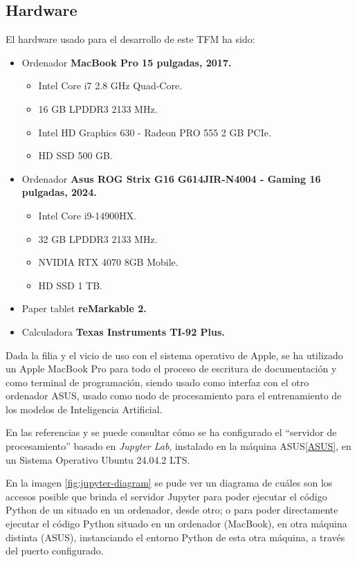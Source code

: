 \subsection{Hardware}

El hardware usado para el desarrollo de este TFM ha sido:

\begin{itemize}
    \item Ordenador \textbf{MacBook Pro 15 pulgadas, 2017.}
    \begin{itemize}
        \item Intel Core i7 2.8 GHz Quad-Core.
        \item 16 GB LPDDR3 2133 MHz.
        \item Intel HD Graphics 630 - Radeon PRO 555 2 GB PCIe.
        \item HD SSD 500 GB.
    \end{itemize}
    \item Ordenador \textbf{Asus ROG Strix G16 G614JIR-N4004 - Gaming 16 pulgadas, 2024.}
    \label{ASUS}
    \begin{itemize}
        \item Intel Core i9-14900HX.
        \item 32 GB LPDDR3 2133 MHz.
        \item NVIDIA RTX 4070 8GB Mobile.
        \item HD SSD 1 TB.
    \end{itemize}
    \item Paper tablet \textbf{reMarkable 2.}
    \item Calculadora \textbf{Texas Instruments TI-92 Plus.}
\end{itemize}

Dada la filia y el vicio de uso con el sistema operativo de Apple, se ha utilizado un Apple MacBook Pro para todo el proceso de escritura de documentación y como terminal de programación, siendo usado como interfaz con el otro ordenador ASUS, usado como nodo de procesamiento para el entrenamiento de los modelos de Inteligencia Artificial.

En las referencias \cite{geeksforgeeks2025jupyter} y \cite{vscode2025jupyter} se puede consultar cómo se ha configurado el ``servidor de procesamiento'' basado en \emph{Jupyter Lab}, instalado en la máquina ASUS\ref{ASUS}, en un Sistema Operativo Ubuntu 24.04.2 LTS.

En la imagen \ref{fig:jupyter-diagram} se pude ver un diagrama de cuáles son los accesos posible que brinda el servidor Jupyter para poder ejecutar el código Python de un situado en un ordenador, desde otro; o para poder directamente ejecutar el código Python situado en un ordenador (MacBook), en otra máquina distinta (ASUS), instanciando el entorno Python de esta otra máquina, a través del puerto configurado.


